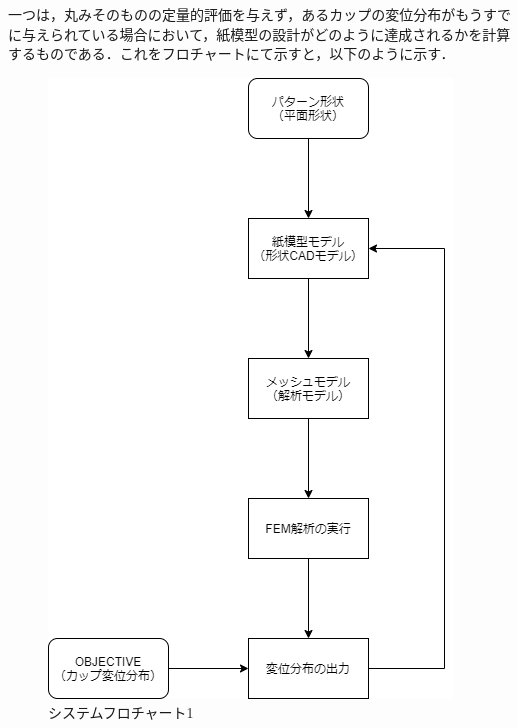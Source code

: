 \documentclass[11pt]{jsarticle}
\begin{document}
			一つは，丸みそのものの定量的評価を与えず，あるカップの変位分布がもうすでに与えられている場合において，紙模型の設計がどのように達成されるかを計算するものである．これをフロチャートにて示すと，以下のように示す．
			\begin{figure}[h!]
				\centering
				\includegraphics[scale=0.5]{./figure/caseB.png}
				\caption{システムフロチャート1}
			\end{figure}
		
\end{document}
